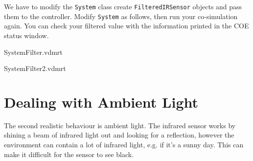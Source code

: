 \documentclass[11pt,a4paper]{../tutorial}
\begin{document}
\begin{instructions}
\item We have to modify the \texttt{System} class create \texttt{FilteredIRSensor} objects and pass them to the controller. Modify \texttt{System} as follows, then run your co-simulation again. You can check your filtered value with the information printed in the COE status window.

    \bigskip
    
    {SystemFilter.vdmrt}

    \bigskip
    
    {SystemFilter2.vdmrt}

\end{instructions}

\newpage
\section{Dealing with Ambient Light}

The second realistic behaviour is ambient light. The infrared sensor works by shining a beam of infrared light out and looking for a reflection, however the environment can contain a lot of infrared light, e.g. if it's a sunny day. This can make it difficult for the sensor to see black.
\end{document}
